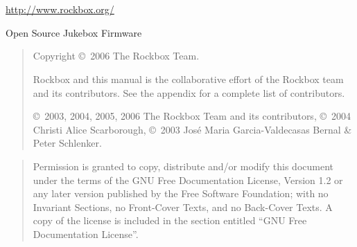 \chapter*{}

\vspace{1cm}
\noindent
\begin{center}
\url{http://www.rockbox.org/}

\noindent
Open Source Jukebox Firmware
\end{center}

\vspace{6cm}
\begin{quote}
  \begin{center}
  Copyright \copyright\ 2006 The Rockbox Team.
  \end{center}
Rockbox and this manual is the collaborative effort of the
Rockbox team and its contributors. See the appendix for a complete list of
contributors.

\copyright\ 2003, 2004, 2005, 2006 The Rockbox Team and its contributors,
\copyright\ 2004 Christi Alice Scarborough,
\copyright\ 2003 Jos\'{e} Maria Garcia-Valdecasas Bernal \& Peter Schlenker.
\end{quote}

\vspace{\fill}
\begin{quote}
  Permission is granted to copy, distribute and/or modify this document
  under the terms of the GNU Free Documentation License, Version 1.2
  or any later version published by the Free Software Foundation;
  with no Invariant Sections, no Front-Cover Texts, and no Back-Cover Texts.
  A copy of the license is included in the section entitled ``GNU
  Free Documentation License''.
\end{quote}


